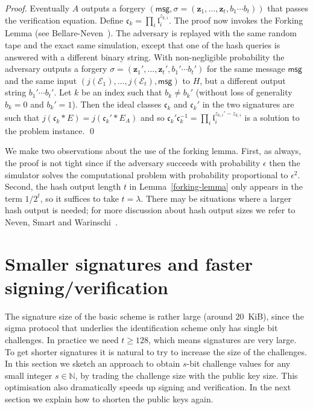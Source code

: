 \documentclass{llncs}
\newcommand{\E}{\mathcal{E}}
\newcommand{\N}{\mathbb{N}}
\newcommand{\msg}{\mathsf{msg}}
\renewcommand{\c}{\mathfrak{c}}
\renewcommand{\l}{\mathfrak{l}}
\newcommand{\z}{\mathbf{z}}
\begin{document}
\begin{proof}
\vskip 0.1cm

Eventually $A$ outputs a forgery $(\msg, \sigma = (\z_1, \dots, \z_t, b_1\cdots b_t))$ that passes the verification equation.
Define $\c_k = \prod_i \l_i^{z_{k,i}}$.
The proof now invokes the Forking Lemma (see Bellare-Neven~\cite{BN06}). The adversary is replayed with the same random tape and the exact same simulation, except that one of the hash queries is answered with a different binary string.
With non-negligible probability the adversary outputs a forgery $\sigma = (\z_1', \dots, \z_t', b_1'\cdots b_t')$ for the same message $\msg$ and the same input $(j(\E_1), \dots, j(\E_t), \msg)$ to $H$, but a different output string $b_1'\cdots b_t'$. Let $k$ be an index such that $b_k \ne b_k'$ (without loss of generality $b_k = 0$ and $b_k' = 1$). Then the ideal classes $\c_k$ and $\c_k'$ in the two signatures are such that $j( \c_k * E ) = j( \c_k' * E_A )$ and so $\c_k' \c_k^{-1} = \prod_i \l_i^{z_{k,i}' - z_{k,i}}$ is a solution to the problem instance. \qed
\end{proof}


We make two observations about the use of the forking lemma.
First, as always, the proof is not tight since if the adversary succeeds with probability $\epsilon$ then the simulator solves the computational problem with probability proportional to $\epsilon^2$.
Second, the hash output length $t$ in Lemma~\ref{forking-lemma} only appears in the term $1/2^t$, so it suffices to take $t = \lambda$.
There may be situations where a larger hash output is needed; for more discussion about hash output sizes we refer to Neven, Smart and Warinschi~\cite{NSW09}.




\section{Smaller signatures and faster signing/verification}\label{sec:smaller-sigs}


The signature size of the basic scheme is rather large (around 20~KiB), since the sigma protocol that underlies the identification scheme only has single bit challenges. 
In practice we need $t \ge 128$, which means signatures are very large.
To get shorter signatures it is natural to try to increase the size of the challenges.
In this section we sketch an approach to obtain $s$-bit challenge values for any small integer $s \in \N$, by trading the challenge size with the public key size. 
This optimisation also dramatically speeds up signing and verification.
In the next section we explain how to shorten the public keys again.
\end{document}
